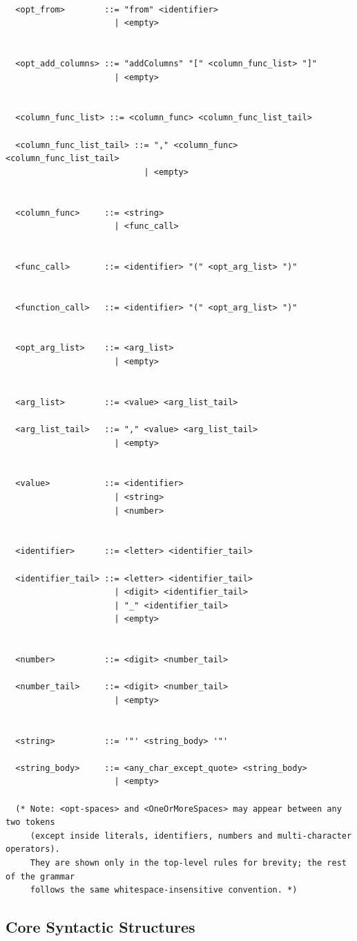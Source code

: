 \begin{itemize}[label=-, noitemsep]
\begin{lstlisting}[style=bnf, caption={Complete BNF grammar of DaQuVa.}, label={lst:bnf}]
  
  <opt_from>        ::= "from" <identifier>
                      | <empty>
  
  
  <opt_add_columns> ::= "addColumns" "[" <column_func_list> "]"
                      | <empty>
  
  
  <column_func_list> ::= <column_func> <column_func_list_tail>
  
  <column_func_list_tail> ::= "," <column_func> <column_func_list_tail>
                            | <empty>
  
  
  <column_func>     ::= <string>
                      | <func_call>
  
  
  <func_call>       ::= <identifier> "(" <opt_arg_list> ")"
  
  
  <function_call>   ::= <identifier> "(" <opt_arg_list> ")"
  
  
  <opt_arg_list>    ::= <arg_list>
                      | <empty>
  
  
  <arg_list>        ::= <value> <arg_list_tail>
  
  <arg_list_tail>   ::= "," <value> <arg_list_tail>
                      | <empty>
  
  
  <value>           ::= <identifier>
                      | <string>
                      | <number>
  
  
  <identifier>      ::= <letter> <identifier_tail>
  
  <identifier_tail> ::= <letter> <identifier_tail>
                      | <digit> <identifier_tail>
                      | "_" <identifier_tail>
                      | <empty>
  
  
  <number>          ::= <digit> <number_tail>
  
  <number_tail>     ::= <digit> <number_tail>
                      | <empty>
  
  
  <string>          ::= '"' <string_body> '"'
  
  <string_body>     ::= <any_char_except_quote> <string_body>
                      | <empty>
  
  (* Note: <opt-spaces> and <OneOrMoreSpaces> may appear between any two tokens
     (except inside literals, identifiers, numbers and multi-character operators).
     They are shown only in the top-level rules for brevity; the rest of the grammar
     follows the same whitespace-insensitive convention. *)
  \end{lstlisting}
\subsection{Core Syntactic Structures}


\end{itemize}
